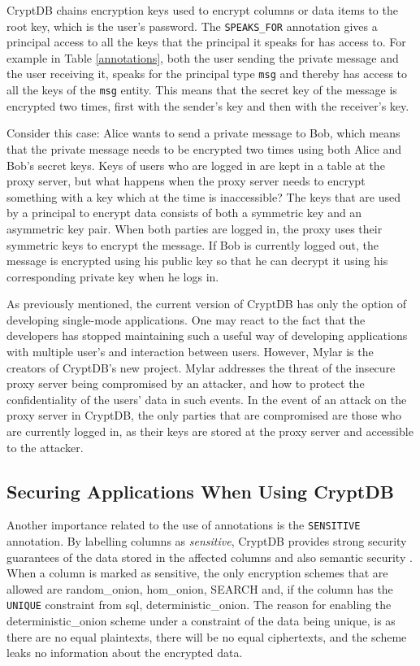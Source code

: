CryptDB chains encryption keys used to encrypt columns or data items to the root key, which is the user's password. The \verb!SPEAKS_FOR! annotation gives a principal access to all the keys that the principal it speaks for has access to. For example in Table \ref{annotations}, both the user sending the private message and the user receiving it, speaks for the principal type \verb!msg! and thereby has access to all the keys of the \verb!msg! entity. This means that the secret key of the message is encrypted two times, first with the sender's key and then with the receiver's key.

Consider this case: Alice wants to send a private message to Bob, which means that the private message needs to be encrypted two times using both Alice and Bob's secret keys. Keys of users who are logged in are kept in a table at the proxy server, but what happens when the proxy server needs to encrypt something with a key which at the time is inaccessible? The keys that are used by a principal to encrypt data consists of both a symmetric key and an asymmetric key pair. When both parties are logged in, the proxy uses their symmetric keys to encrypt the message. If Bob is currently logged out, the message is encrypted using his public key so that he can decrypt it using his corresponding private key when he logs in.

As previously mentioned, the current version of CryptDB has only the option of developing single-mode applications. One may react to the fact that the developers has stopped maintaining such a useful way of developing applications with multiple user's and interaction between users. However, Mylar \cite{mylar_homepage} is the creators of CryptDB's new project. Mylar addresses the threat of the insecure proxy server being compromised by an attacker, and how to protect the confidentiality of the users' data in such events. In the event of an attack on the proxy server in CryptDB, the only parties that are compromised are those who are currently logged in, as their keys are stored at the proxy server and accessible to the attacker.


\subsection{Securing Applications When Using CryptDB}
\label{sec:sensitive}

Another importance related to the use of annotations is the \verb!SENSITIVE! annotation. By labelling columns as \emph{sensitive}, CryptDB provides strong security guarantees of the data stored in the affected columns and also semantic security \cite{popa_thesis}. When a column is marked as sensitive, the only encryption schemes that are allowed are \gls{random_onion}, \gls{hom_onion}, SEARCH and, if the column has the \verb!UNIQUE! constraint from \gls{sql}, \gls{deterministic_onion}. The reason for enabling the \gls{deterministic_onion} scheme under a constraint of the data being unique, is as there are no equal plaintexts, there will be no equal ciphertexts, and the scheme leaks no information about the encrypted data.




